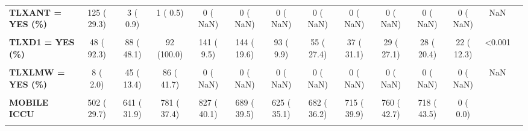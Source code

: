 \documentclass[
]{article}
\begin{document}
\begin{table}[H]
\begin{tabular}[t]{>{\raggedright\arraybackslash}p{5em}ccccccccccccc}
\textbf{TLXANT = YES (\%)} & 125 ( 29.3) & 3 (  0.9) & 1 (  0.5) & 0 (  NaN) & 0 (  NaN) & 0 (  NaN) & 0 (  NaN) & 0 (  NaN) & 0 (  NaN) & 0 (  NaN) & 0 (  NaN) & NaN & \\
\textbf{\cellcolor{gray!10}{TLXASA = YES (\%)}} & \cellcolor{gray!10}{399 ( 91.7)} & \cellcolor{gray!10}{292 ( 86.9)} & \cellcolor{gray!10}{182 ( 88.3)} & \cellcolor{gray!10}{0 (  NaN)} & \cellcolor{gray!10}{0 (  NaN)} & \cellcolor{gray!10}{0 (  NaN)} & \cellcolor{gray!10}{0 (  NaN)} & \cellcolor{gray!10}{0 (  NaN)} & \cellcolor{gray!10}{0 (  NaN)} & \cellcolor{gray!10}{0 (  NaN)} & \cellcolor{gray!10}{0 (  NaN)} & \cellcolor{gray!10}{NaN} & \cellcolor{gray!10}{}\\
\textbf{TLXD1 = YES (\%)} & 48 ( 92.3) & 88 ( 48.1) & 92 (100.0) & 141 (  9.5) & 144 ( 19.6) & 93 (  9.9) & 55 ( 27.4) & 37 ( 31.1) & 29 ( 27.1) & 28 ( 20.4) & 22 ( 12.3) & <0.001 & \\
\textbf{\cellcolor{gray!10}{TLXHEP = YES (\%)}} & \cellcolor{gray!10}{387 ( 88.4)} & \cellcolor{gray!10}{235 ( 69.9)} & \cellcolor{gray!10}{113 ( 54.9)} & \cellcolor{gray!10}{0 (  NaN)} & \cellcolor{gray!10}{0 (  NaN)} & \cellcolor{gray!10}{0 (  NaN)} & \cellcolor{gray!10}{0 (  NaN)} & \cellcolor{gray!10}{0 (  NaN)} & \cellcolor{gray!10}{0 (  NaN)} & \cellcolor{gray!10}{0 (  NaN)} & \cellcolor{gray!10}{0 (  NaN)} & \cellcolor{gray!10}{NaN} & \cellcolor{gray!10}{}\\
\textbf{TLXLMW = YES (\%)} & 8 (  2.0) & 45 ( 13.4) & 86 ( 41.7) & 0 (  NaN) & 0 (  NaN) & 0 (  NaN) & 0 (  NaN) & 0 (  NaN) & 0 (  NaN) & 0 (  NaN) & 0 (  NaN) & NaN & \\
\textbf{\cellcolor{gray!10}{TMODE (\%)}} & \cellcolor{gray!10}{} & \cellcolor{gray!10}{} & \cellcolor{gray!10}{} & \cellcolor{gray!10}{} & \cellcolor{gray!10}{} & \cellcolor{gray!10}{} & \cellcolor{gray!10}{} & \cellcolor{gray!10}{} & \cellcolor{gray!10}{} & \cellcolor{gray!10}{} & \cellcolor{gray!10}{} & \cellcolor{gray!10}{<0.001} & \cellcolor{gray!10}{}\\
\textbf{MOBILE ICCU} & 502 ( 29.7) & 641 ( 31.9) & 781 ( 37.4) & 827 ( 40.1) & 689 ( 39.5) & 625 ( 35.1) & 682 ( 36.2) & 715 ( 39.9) & 760 ( 42.7) & 718 ( 43.5) & 0 (  0.0) &  & \\
\textbf{\cellcolor{gray!10}{MOBILE ICU}} & \cellcolor{gray!10}{0 (  0.0)} & \cellcolor{gray!10}{0 (  0.0)} & \cellcolor{gray!10}{0 (  0.0)} & \cellcolor{gray!10}{0 (  0.0)} & \cellcolor{gray!10}{0 (  0.0)} & \cellcolor{gray!10}{0 (  0.0)} & \cellcolor{gray!10}{0 (  0.0)} & \cellcolor{gray!10}{0 (  0.0)} & \cellcolor{gray!10}{0 (  0.0)} & \cellcolor{gray!10}{0 (  0.0)} & \cellcolor{gray!10}{616 ( 42.3)} & \cellcolor{gray!10}{} & \cellcolor{gray!10}{}\\

\end{tabular}
\end{table}
\end{document}
